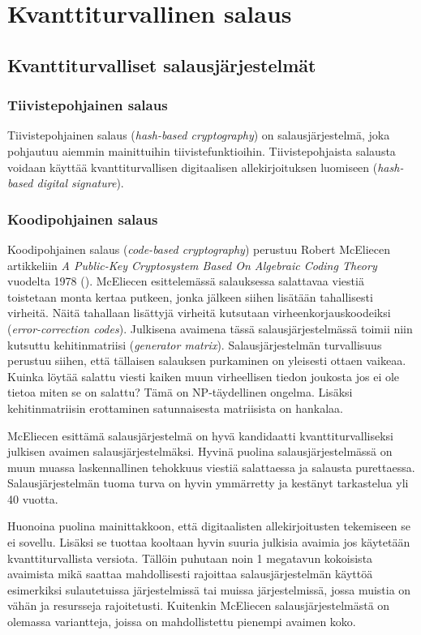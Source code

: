 \chapter{Kvanttiturvallinen salaus\label{results}}

\section{Kvanttiturvalliset salausjärjestelmät}

\subsection{Tiivistepohjainen salaus}
Tiivistepohjainen salaus (\emph{hash-based cryptography}) on salausjärjestelmä, joka pohjautuu aiemmin mainittuihin tiivistefunktioihin. Tiivistepohjaista salausta voidaan käyttää kvanttiturvallisen digitaalisen allekirjoituksen luomiseen (\emph{hash-based digital signature}).

\subsection{Koodipohjainen salaus}
Koodipohjainen salaus (\emph{code-based cryptography}) perustuu Robert McEliecen artikkeliin \emph{A Public-Key Cryptosystem Based On Algebraic Coding Theory} vuodelta 1978 (\cite{8012331}). McEliecen esittelemässä salauksessa salattavaa viestiä toistetaan monta kertaa putkeen, jonka jälkeen siihen lisätään tahallisesti virheitä. Näitä tahallaan lisättyjä virheitä kutsutaan virheenkorjauskoodeiksi (\emph{error-correction codes}). Julkisena avaimena tässä salausjärjestelmässä toimii niin kutsuttu kehitinmatriisi (\emph{generator matrix}). Salausjärjestelmän turvallisuus perustuu siihen, että tällaisen salauksen purkaminen on yleisesti ottaen vaikeaa. Kuinka löytää salattu viesti kaiken muun virheellisen tiedon joukosta jos ei ole tietoa miten se on salattu? Tämä on NP-täydellinen ongelma. Lisäksi kehitinmatriisin erottaminen satunnaisesta matriisista on hankalaa.

McEliecen esittämä salausjärjestelmä on hyvä kandidaatti kvanttiturvalliseksi julkisen avaimen salausjärjestelmäksi. Hyvinä puolina salausjärjestelmässä on muun muassa laskennallinen tehokkuus viestiä salattaessa ja salausta purettaessa. Salausjärjestelmän tuoma turva on hyvin ymmärretty ja kestänyt tarkastelua yli 40 vuotta.

Huonoina puolina mainittakkoon, että digitaalisten allekirjoitusten tekemiseen se ei sovellu. Lisäksi se tuottaa kooltaan hyvin suuria julkisia avaimia jos käytetään kvanttiturvallista versiota. Tällöin puhutaan noin 1 megatavun kokoisista avaimista mikä saattaa mahdollisesti rajoittaa salausjärjestelmän käyttöä esimerkiksi sulautetuissa järjestelmissä tai muissa järjestelmissä, jossa muistia on vähän ja resursseja rajoitetusti. Kuitenkin McEliecen salausjärjestelmästä on olemassa variantteja, joissa on mahdollistettu pienempi avaimen koko.


